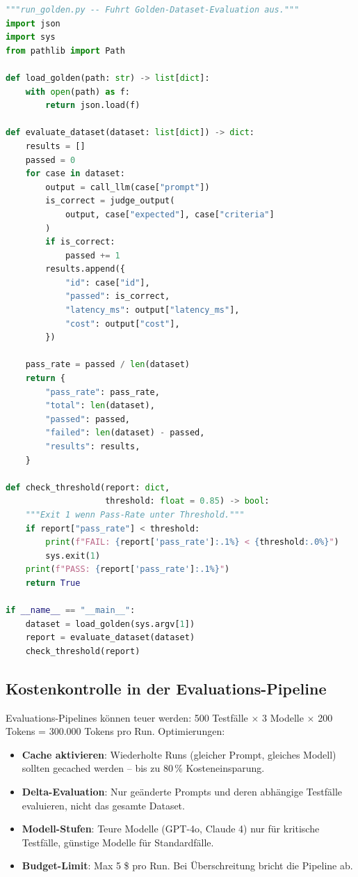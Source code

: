 \begin{lstlisting}[language=Python, caption={CI-Script: Golden-Dataset-Evaluator}, label=lst:eval-ci-script]
"""run_golden.py -- Fuhrt Golden-Dataset-Evaluation aus."""
import json
import sys
from pathlib import Path

def load_golden(path: str) -> list[dict]:
    with open(path) as f:
        return json.load(f)

def evaluate_dataset(dataset: list[dict]) -> dict:
    results = []
    passed = 0
    for case in dataset:
        output = call_llm(case["prompt"])
        is_correct = judge_output(
            output, case["expected"], case["criteria"]
        )
        if is_correct:
            passed += 1
        results.append({
            "id": case["id"],
            "passed": is_correct,
            "latency_ms": output["latency_ms"],
            "cost": output["cost"],
        })

    pass_rate = passed / len(dataset)
    return {
        "pass_rate": pass_rate,
        "total": len(dataset),
        "passed": passed,
        "failed": len(dataset) - passed,
        "results": results,
    }

def check_threshold(report: dict,
                    threshold: float = 0.85) -> bool:
    """Exit 1 wenn Pass-Rate unter Threshold."""
    if report["pass_rate"] < threshold:
        print(f"FAIL: {report['pass_rate']:.1%} < {threshold:.0%}")
        sys.exit(1)
    print(f"PASS: {report['pass_rate']:.1%}")
    return True

if __name__ == "__main__":
    dataset = load_golden(sys.argv[1])
    report = evaluate_dataset(dataset)
    check_threshold(report)
\end{lstlisting}

\subsection{Kostenkontrolle in der Evaluations-Pipeline}

Evaluations-Pipelines können teuer werden: 500 Testfälle $\times$ 3
Modelle $\times$ 200 Tokens = 300.000 Tokens pro Run. Optimierungen:

\begin{itemize}[leftmargin=*]
    \item \textbf{Cache aktivieren}: Wiederholte Runs (gleicher Prompt,
    gleiches Modell) sollten gecached werden -- bis zu 80\,\%
    Kosteneinsparung.
    \item \textbf{Delta-Evaluation}: Nur geänderte Prompts und deren
    abhängige Testfälle evaluieren, nicht das gesamte Dataset.
    \item \textbf{Modell-Stufen}: Teure Modelle (GPT-4o, Claude 4) nur
    für kritische Testfälle, günstige Modelle für Standardfälle.
    \item \textbf{Budget-Limit}: Max 5 \$ pro Run. Bei Überschreitung
    bricht die Pipeline ab.
\end{itemize}

